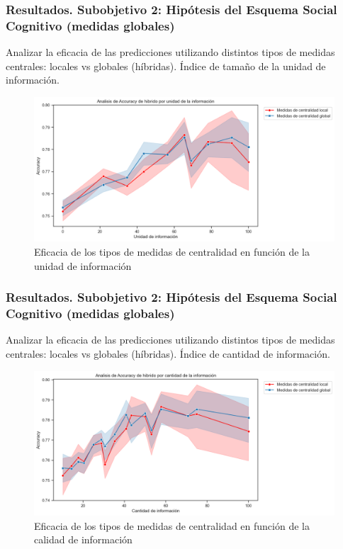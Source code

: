 \documentclass{beamer}
\begin{document}
\begin{frame}
	\frametitle{Resultados. Subobjetivo 2: Hipótesis del Esquema Social Cognitivo (medidas globales)}
\begin{block}{Analizar la eficacia de las predicciones utilizando
		distintos tipos de medidas centrales: locales vs globales (híbridas).}
		Índice de tamaño de la unidad de información.
	\end{block}
	
\begin{figure}[H]
	\centering
	\includegraphics[width=0.6\linewidth]{figs/cap7/figura_44}
	\caption{Eficacia de los tipos de medidas de centralidad en función de la unidad  de información}
	\label{fig:figura225}
\end{figure}

	
	
	
\end{frame}


\begin{frame}
	\frametitle{Resultados. Subobjetivo 2: Hipótesis del Esquema Social Cognitivo (medidas globales)}
\begin{block}{Analizar la eficacia de las predicciones utilizando
		distintos tipos de medidas centrales: locales vs globales (híbridas).}
		Índice de cantidad de información.
	\end{block}
	
\begin{figure}[H]
	\centering
	\includegraphics[width=0.6\linewidth]{figs/cap7/figura_45}
	\caption{Eficacia de los tipos de medidas de centralidad en función de la calidad  de información}
	\label{fig:figura226}
\end{figure}


	
	
	
\end{frame}
\end{document}
